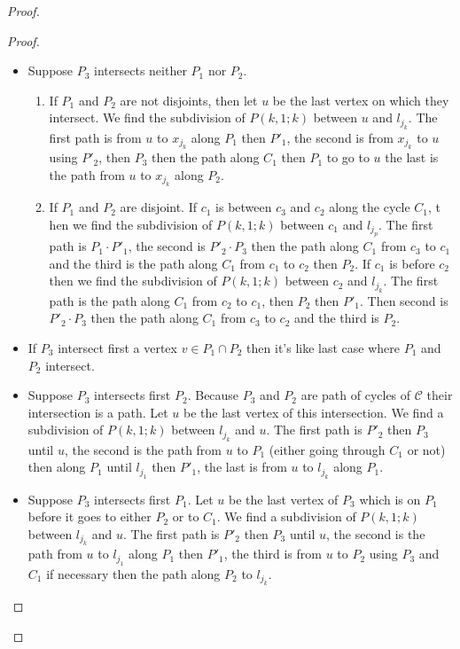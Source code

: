 \documentclass[utf8,10pt]{article}
\theoremstyle{plain}
\theoremstyle{definition}
\theoremstyle{remark}
\begin{document}
\begin{proof}
\begin{proof}
\begin{itemize}
	\item Suppose $P_3$ intersects neither $P_1$ nor $P_2$.
	\begin{enumerate}
		\item If $P_1$ and $P_2 $ are not disjoints,
		then let $u$ be the last vertex on which they intersect. We find the subdivision of $P(k,1;k)$ between $u$ and $l_{j_k}$.
		The first path is from $u$ to $x_{j_k}$ along $P_1$ then $P'_1$, the second is from $x_{j_k}$
		to $u$ using $P'_2$, then $P_3$ then the path along $C_1$
		then $P_1$ to go to $u$ the last is the path from $u$ to $x_{j_k}$ along $P_2$.
		\item 	If $P_1$ and $P_2$ are disjoint. If $c_1$ is between $c_3$ and $c_2$ along the cycle $C_1$, t
		hen we find the subdivision of $P(k,1;k)$
		between $c_1$ and $l_{j_p}$. The first path is $P_1 \cdot P'_1$, the second is $P'_2 \cdot P_3$
		then the path along $C_1$ from $c_3$ to $c_1$ and the third
		is the path along $C_1$ from $c_1$ to $c_2$ then $P_2$. If $c_1$ is before
		 $c_2$ then we find the subdivision of $P(k,1;k)$ between $c_2$ and
		$l_{j_k} $. The first path is the path along $C_1$ from $c_2$ to $c_1$, then $P_2$ then $P'_1$.
		Then second is $P'_2 \cdot P_3$ then the path along $C_1$ from
		$c_3$ to $c_2$ and the third is $P_2$.
\end{enumerate}
	\item If $P_3$ intersect first a vertex $v \in P_1 \cap P_2$ then it's like last case where $P_1$ and $P_2$ intersect.
	\item Suppose $P_3$ intersects first $P_2$. Because $P_3$ and $P_2$ are path of cycles of $\mathcal{C}$
	their intersection is a path. Let $u$ be the last vertex of this intersection.
	We find a subdivision of $P(k,1;k)$ between $l_{j_k}$ and $u$.
	The first path is $P'_2$ then $P_3$ until $u$, the second is the path from $u$ to $P_1$ (either going
	through $C_1$ or not) then along $P_1$ until $l_{j_1}$ then $P'_1$, the last is from $u$ to $l_{j_k}$ along $P_1$.
	\item Suppose $P_3$ intersects first $P_1$. Let $u$ be the last vertex of $P_3$ which
	 is on $P_1$ before it goes to either $P_2$ or to $C_1$.
	We find a subdivision of $P(k,1;k)$ between $l_{j_k}$ and $u$. The first path is $P'_2$ then
	$P_3$ until $u$, the second is the path from $u$ to	$l_{j_1}$ along $P_1$ then $P'_1$,
	the third is from $u$ to $P_2$ using $P_3$ and $C_1$ if necessary then the path along $P_2$ to  $l_{j_k}$.
\end{itemize}



\end{proof}
\end{proof}
\end{document}
